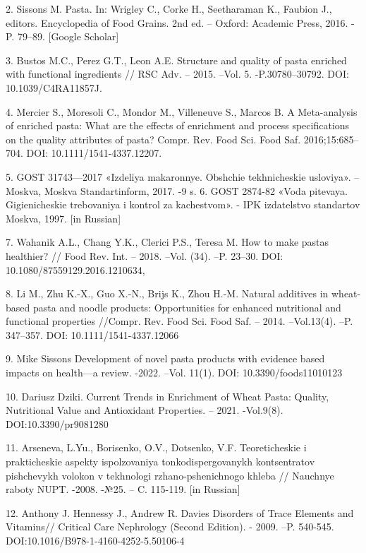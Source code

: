 2. Sissons M. Pasta. In: Wrigley C., Corke H., Seetharaman K., Faubion
J., editors. Encyclopedia of Food Grains. 2nd ed. -- Oxford: Academic
Press, 2016. - P. 79--89. {[}Google Scholar{]}

3. Bustos M.C., Perez G.T., Leon A.E. Structure and quality of pasta
enriched with functional ingredients // RSC Adv. -- 2015. --Vol. 5.
-P.30780--30792. DOI: 10.1039/C4RA11857J.

4. Mercier S., Moresoli C., Mondor M., Villeneuve S., Marcos B. A
Meta-analysis of enriched pasta: What are the effects of enrichment and
process specifications on the quality attributes of pasta? Compr. Rev.
Food Sci. Food Saf. 2016;15:685--704. DOI: 10.1111/1541-4337.12207.

5. GOST 31743---2017 «Izdeliya makaronnye. Obshchie tekhnicheskie
usloviya». --Moskva, Moskva Standartinform, 2017. -9 s. 6. GOST 2874-82
«Voda pit\textquotesingle evaya. Gigienicheskie trebovaniya i
kontrol\textquotesingle{} za kachestvom». - IPK
izdatel\textquotesingle stvo standartov Moskva, 1997. {[}in Russian{]}

7. Wahanik A.L., Chang Y.K., Clerici P.S., Teresa M. How to make pastas
healthier? // Food Rev. Int. -- 2018. --Vol. (34). --P. 23--30. DOI:
10.1080/87559129.2016.1210634,

8. Li M., Zhu K.-X., Guo X.-N., Brijs K., Zhou H.-M. Natural additives
in wheat-based pasta and noodle products: Opportunities for enhanced
nutritional and functional properties //Compr. Rev. Food Sci. Food Saf.
-- 2014. --Vol.13(4). --P. 347--357. DOI: 10.1111/1541-4337.12066

9. Mike Sissons Development of novel pasta products with evidence based
impacts on health---a review. -2022. --Vol. 11(1). DOI:
10.3390/foods11010123

10. Dariusz Dziki. Current Trends in Enrichment of Wheat Pasta: Quality,
Nutritional Value and Antioxidant Properties. -- 2021. -Vol.9(8).
DOI:10.3390/pr9081280

11. Arsen\textquotesingle eva, L.Yu., Borisenko, O.V., Dotsenko, V.F.
Teoreticheskie i prakticheskie aspekty ispol\textquotesingle zovaniya
tonkodispergovanykh kontsentratov pishchevykh volokon v tekhnologi
rzhano-pshenichnogo khleba // Nauchnye raboty NUPT. -2008. -№25. -- C.
115-119. {[}in Russian{]}

12. Anthony J. Hennessy J., Andrew R. Davies Disorders of Trace Elements
and Vitamins// Critical Care Nephrology (Second Edition). - 2009. --P.
540-545. DOI:10.1016/B978-1-4160-4252-5.50106-4


